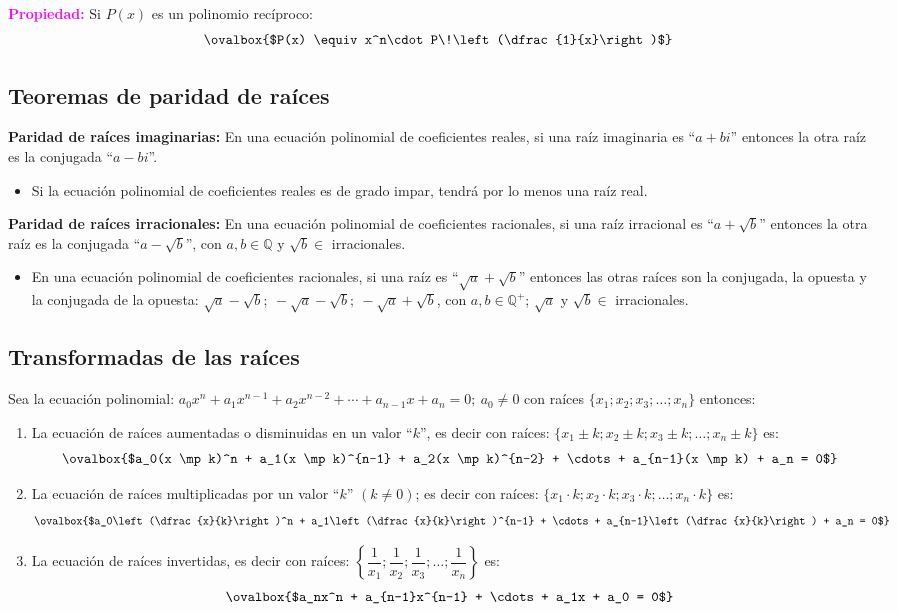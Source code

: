 \documentclass[11pt,a4paper]{article}
\newcommand{\cn}[1]{\raisebox{.5pt}{\textcircled{\raisebox{-.9pt}{\scriptsize #1}}}}
\begin{document}
\textcolor{magenta}{\textbf{Propiedad:}} Si $P(x)$ es un polinomio recíproco:
\[\ovalbox{$P(x) \equiv x^n\cdot P\!\left(\dfrac{1}{x}\right)$}\]

\subsection*{Teoremas de paridad de raíces}

\textcolor{verde}{\textbf{Paridad de raíces imaginarias:}} En una ecuación polinomial de
coeficientes reales, si una raíz imaginaria es ``$a + bi$'' entonces la otra raíz es la
conjugada ``$a - bi$''.
\begin{itemize}
  \item Si la ecuación polinomial de coeficientes reales es de grado impar, tendrá por lo
  menos una raíz real.
\end{itemize}

\textcolor{verde}{\textbf{Paridad de raíces irracionales:}} En una ecuación polinomial de
coeficientes racionales, si una raíz irracional es ``$a + \sqrt{b}$'' entonces la otra raíz
es la conjugada ``$a - \sqrt{b}$'', con $a, b \in \mathbb{Q}$ y $\sqrt{b} \in$ irracionales.
\begin{itemize}
  \item En una ecuación polinomial de coeficientes racionales, si una raíz es
  ``$\sqrt{a} + \sqrt{b}$'' entonces las otras raíces son la conjugada, la opuesta y la
  conjugada de la opuesta: $\sqrt{a} - \sqrt{b};\ -\sqrt{a} - \sqrt{b};\ -\sqrt{a} + \sqrt{b}$,
  con $a, b \in \mathbb{Q}^+$; $\sqrt{a}$ y $\sqrt{b} \in$ irracionales.
\end{itemize}

\subsection*{Transformadas de las raíces}
Sea la ecuación polinomial:
$a_0x^n + a_1x^{n-1} + a_2x^{n-2} + \cdots + a_{n-1}x + a_n = 0;\ a_0 \neq 0$ con raíces
$\{x_1; x_2; x_3; \ldots; x_n\}$ entonces:

\begin{enumerate}[label=\cn{\arabic*}]
  \item La ecuación de raíces aumentadas o disminuidas en un valor ``$k$'', es decir con
  raíces: $\{x_1 \pm k; x_2 \pm k; x_3 \pm k; \ldots; x_n \pm k\}$ es:
  \[\ovalbox{$a_0(x \mp k)^n + a_1(x \mp k)^{n-1} + a_2(x \mp k)^{n-2} + \cdots + a_{n-1}(x \mp k) + a_n = 0$}\]
  \item La ecuación de raíces multiplicadas por un valor ``$k$'' $(k \neq 0)$; es decir con
  raíces: $\{x_1\cdot k; x_2\cdot k; x_3\cdot k; \ldots; x_n\cdot k\}$ es:
  \[\ovalbox{$a_0\left(\dfrac{x}{k}\right)^n + a_1\left(\dfrac{x}{k}\right)^{n-1} + \cdots + a_{n-1}\left(\dfrac{x}{k}\right) + a_n = 0$}\]
  \item La ecuación de raíces invertidas, es decir con raíces:
  $\left\{\dfrac{1}{x_1}; \dfrac{1}{x_2}; \dfrac{1}{x_3}; \ldots; \dfrac{1}{x_n}\right\}$ es:
  \[\ovalbox{$a_nx^n + a_{n-1}x^{n-1} + \cdots + a_1x + a_0 = 0$}\]
\end{enumerate}
\end{document}
